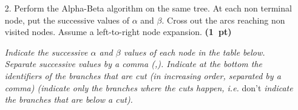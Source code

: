 \documentclass[11pt,a4paper]{report}
\begin{document}
\begin{enumerate}
\item[2.] Perform the Alpha-Beta algorithm on the same tree.
      At each non terminal node, put the successive values of $\alpha$ and
      $\beta$. Cross out the arcs reaching non visited nodes. Assume a
      left-to-right node expansion. \textbf{(1~pt)}
      
      \textit{Indicate the successive $\alpha$ and $\beta$ values of each node in the table below. Separate successive values by a comma (,). Indicate at the bottom the identifiers of the branches that are cut (in increasing order, separated by a comma) (indicate only the branches where the cuts happen, i.e.\!} don't \textit{indicate the branches that are below a cut).}
\end{enumerate}
\end{document}
